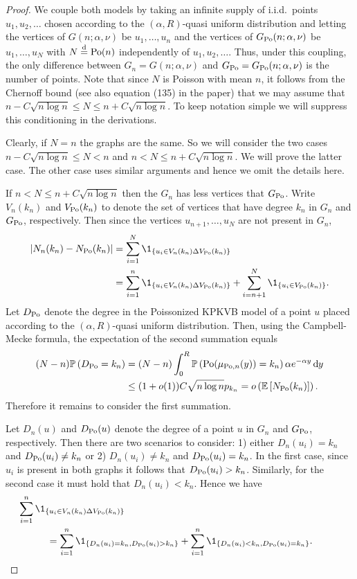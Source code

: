 \begin{proof}
We couple both models by taking an infinite supply of i.i.d.~points $u_1, u_2, \dots$ chosen according
to the $(\alpha,R)$-quasi uniform distribution and letting the vertices of $G(n;\alpha,\nu)$ be $u_1,\dots, u_n$ and
the vertices of $G_{{\mathrm{Po}}}(n;\alpha,\nu)$ be $u_1,\dots, u_N$ with $N\stackrel{\text{d}}{=} {\mathrm{Po}}(n)$ independently of
$u_1, u_2, \dots$. Thus, under this coupling, the only difference between $G_n = G(n;\alpha,\nu)$ and $G_{{\mathrm{Po}}} = G_{{\mathrm{Po}}}(n;\alpha,\nu)$ is the number of points. Note that since $N$ is Poisson with mean $n$, it follows from the Chernoff bound (see also equation (135) in the paper) that we may assume that $n - C\sqrt{n \log n} \le N \le n + C \sqrt{n \log n}$. To keep notation simple we will suppress this conditioning in the derivations.

Clearly, if $N = n$ the graphs are the same. So we will consider the two cases $n - C\sqrt{n \log n} \le N < n$ and $n < N \le n + C \sqrt{n \log n}$. We will prove the latter case. The other case uses similar arguments and hence we omit the details here.

If $n < N \le n + C \sqrt{n \log n}$ then the $G_n$ has less vertices that $G_{{\mathrm{Po}}}$. Write $V_n(k_n)$ and $V_{{\mathrm{Po}}}(k_n)$ to denote the set of vertices that have degree $k_n$ in $G_n$ and $G_{{\mathrm{Po}}}$, respectively. Then since the vertices $u_{n+1}, \dots, u_N$ are not present in $G_n$,
\begin{align*}
	\left|N_n(k_n) - N_{\Po}(k_n)\right| &= \sum_{i = 1}^N \1_{\left\{u_i \in V_n(k_n) \Delta V_{\Po}(k_n)\right\}}\\
	&= \sum_{i = 1}^n \1_{\left\{u_i \in V_n(k_n) \Delta V_{\Po}(k_n)\right\}}
		+ \sum_{i = n+1}^N \1_{\left\{u_i \in V_{\Po}(k_n)\right\}}.
\end{align*}
Let $D_{{\mathrm{Po}}}$ denote the degree in the Poissonized KPKVB model of a point $u$ placed according to the $(\alpha,R)$-quasi uniform distribution. Then, using the Campbell-Mecke formula, the expectation of the second summation equals
\begin{align*}
	(N-n) \mathbb{P}\left(D_{{\mathrm{Po}}} = k_n\right) &= (N-n) \int_0^R \mathbb{P}\left({\mathrm{Po}}(\mu_{{\mathrm{Po}},n}(y)) = k_n\right) \alpha e^{-\alpha y} \operatorname{\mathrm{d}\hspace{-2pt}} y\\
	&\le (1+o(1)) C \sqrt{n \log n} p_{k_n} = o\left(\mathbb{E}\left[N_{{\mathrm{Po}}}(k_n)\right]\right).
\end{align*}
Therefore it remains to consider the first summation.

Let $D_n(u)$ and $D_{{\mathrm{Po}}}(u)$ denote the degree of a point $u$ in $G_n$ and $G_{{\mathrm{Po}}}$, respectively. Then there are two scenarios to consider: 1) either $D_n(u_i) = k_n$ and $D_{{\mathrm{Po}}}(u_i) \ne k_n$ or 2) $D_n(u_i) \ne k_n$ and $D_{{\mathrm{Po}}}(u_i) = k_n$. In the first case, since $u_i$ is present in both graphs it follows that $D_{{\mathrm{Po}}}(u_i) > k_n$. Similarly, for the second case it must hold that $D_n(u_i) < k_n$. Hence we have
\begin{align*}
	&\hspace{-30pt}\sum_{i = 1}^n \1_{\left\{u_i \in V_n(k_n) \Delta V_{\Po}(k_n)\right\}}\\
	&= \sum_{i = 1}^n \1_{\left\{D_n(u_i) = k_n, D_{\Po}(u_i) > k_n\right\}}
		+ \sum_{i = 1}^n \1_{\left\{D_n(u_i) < k_n, D_{\Po}(u_i) = k_n\right\}}.
\end{align*}


\end{proof}
